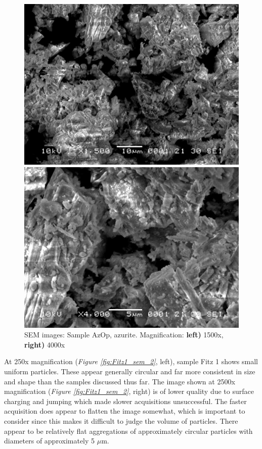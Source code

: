 \begin{figure}[H]
\centering
\begin{minipage}{.45\textwidth}
  \centering
  \includegraphics[width=\linewidth]{AzOp_x1500_2_150321}
\end{minipage}
\begin{minipage}{.45\textwidth}
  \centering
  \includegraphics[width=\linewidth]{AzOp_x4000_1_150321}
\end{minipage}
\caption[SEM images: Sample AzOp, azurite]{SEM images: Sample AzOp, azurite. Magnification: \textbf{left)} 1500x, \textbf{right)} 4000x}
\label{fig:azop_sem_4}
\end{figure}


At 250x magnification (\textit{Figure \ref{fig:Fitz1_sem_2}}, left), sample Fitz 1 shows small uniform particles. These appear generally circular and far more consistent in size and shape than the samples discussed thus far. The image shown at 2500x magnification (\textit{Figure \ref{fig:Fitz1_sem_2}}, right) is of lower quality due to surface charging and jumping which made slower acquisitions unsuccessful. The faster acquisition does appear to flatten the image somewhat, which is important to consider since this makes it difficult to judge the volume of particles. There appear to be relatively flat aggregations of approximately circular particles with diameters of approximately 5 $\mu$m.


